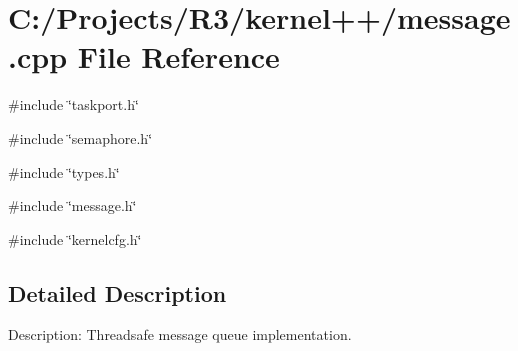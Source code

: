 \section{C:/Projects/R3/kernel++/message.cpp File Reference}
\label{message_8cpp}
{\ttfamily \#include \char`\"{}taskport.h\char`\"{}}\par
{\ttfamily \#include \char`\"{}semaphore.h\char`\"{}}\par
{\ttfamily \#include \char`\"{}types.h\char`\"{}}\par
{\ttfamily \#include \char`\"{}message.h\char`\"{}}\par
{\ttfamily \#include \char`\"{}kernelcfg.h\char`\"{}}\par


\subsection{Detailed Description}
Description: Threadsafe message queue implementation. 